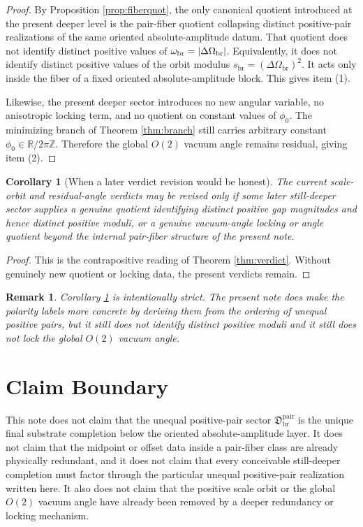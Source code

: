 \documentclass[11pt]{article}
\newcommand{\ScaleMod}{s_{\mathrm{br}}}
\newcommand{\AbsScaleAmp}{\omega_{\mathrm{br}}}
\newcommand{\PairSector}{\mathfrak D_{\mathrm{br}}^{\mathrm{pair}}}
\newcommand{\GapScale}{\Delta \Omega_{\mathrm{br}}}
\newtheorem{remark}{Remark}
\newtheorem{corollary}{Corollary}
\begin{document}
\begin{proof}
By Proposition \ref{prop:fiberquot}, the only canonical quotient introduced at the present deeper level is the pair-fiber quotient collapsing distinct positive-pair realizations of the same oriented absolute-amplitude datum. That quotient does not identify distinct positive values of \(\AbsScaleAmp=\abs{\GapScale}\). Equivalently, it does not identify distinct positive values of the orbit modulus \(\ScaleMod=(\GapScale)^{2}\). It acts only inside the fiber of a fixed oriented absolute-amplitude block. This gives item (1).

Likewise, the present deeper sector introduces no new angular variable, no anisotropic locking term, and no quotient on constant values of \(\phi_{0}\). The minimizing branch of Theorem \ref{thm:branch} still carries arbitrary constant \(\phi_{0}\in\mathbb R/2\pi\mathbb Z\). Therefore the global \(O(2)\) vacuum angle remains residual, giving item (2).
\end{proof}

\begin{corollary}[When a later verdict revision would be honest]
\label{cor:revision}
The current scale-orbit and residual-angle verdicts may be revised only if some later still-deeper sector supplies a genuine quotient identifying distinct positive gap magnitudes and hence distinct positive moduli, or a genuine vacuum-angle locking or angle quotient beyond the internal pair-fiber structure of the present note.
\end{corollary}

\begin{proof}
This is the contrapositive reading of Theorem \ref{thm:verdict}. Without genuinely new quotient or locking data, the present verdicts remain.
\end{proof}

\begin{remark}
Corollary \ref{cor:revision} is intentionally strict. The present note does make the polarity labels more concrete by deriving them from the ordering of unequal positive pairs, but it still does not identify distinct positive moduli and it still does not lock the global \(O(2)\) vacuum angle.
\end{remark}

\section{Claim Boundary}

This note does not claim that the unequal positive-pair sector \(\PairSector\) is the unique final substrate completion below the oriented absolute-amplitude layer. It does not claim that the midpoint or offset data inside a pair-fiber class are already physically redundant, and it does not claim that every conceivable still-deeper completion must factor through the particular unequal positive-pair realization written here. It also does not claim that the positive scale orbit or the global \(O(2)\) vacuum angle have already been removed by a deeper redundancy or locking mechanism.
\end{document}
